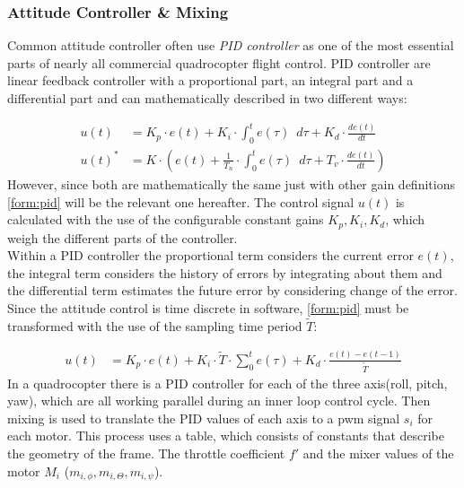 \newpage

\subsubsection{Attitude Controller \& Mixing} \label{sec:pid}
Common attitude controller often use \emph{PID controller}  as one of the most essential parts of nearly all commercial quadrocopter flight control. PID controller are linear feedback controller with a proportional part, an integral part and a differential part and can mathematically described in two different ways:

\begin{align}
	u(t) &= K_p \cdot e(t) + K_i \cdot \int_{0}^{t} e(\tau) \enspace d\tau + K_d \cdot \frac{de(t)}{dt} \label{form:pid}\\
	u(t)^* &= K \cdot ( e(t) + \frac{1}{T_n} \cdot \int_{0}^{t} e(\tau) \enspace d\tau + T_v \cdot \frac{de(t)}{dt})
\end{align}
\newline
However, since both are mathematically the same just with other gain definitions \cref{form:pid} will be the relevant one hereafter. The control signal $u(t)$ is calculated with the use of the configurable constant gains $K_p, K_i, K_d$, which weigh the different parts of the controller.\\
Within a PID controller the proportional term considers the current error $e(t)$, the integral term considers the history of errors by integrating about them and the differential term estimates the future error by considering change of the error. Since the attitude control is time discrete in software, \cref{form:pid} must be transformed with the use of the sampling time period $\tilde{T}$:

\begin{align}
	u(t) &= K_p \cdot e(t) + K_i \cdot \tilde{T} \cdot \sum_{0}^{t}e(\tau) + K_d \cdot \frac{e(t) - e(t-1)}{\tilde{T}} \label{form:pid2}
\end{align}
\newline
In a quadrocopter there is a PID controller for each of the three axis(roll, pitch, yaw), which are all working parallel during an inner loop control cycle. Then mixing is used to translate the PID values of each axis to a pwm signal $s_i$ for each motor. This process uses a table, which consists of constants that describe the geometry of the frame.  The throttle coefficient $f'$ and the mixer values of the motor $M_i$ ($m_{i,\phi}, m_{i,\Theta}, m_{i,\psi}$).

